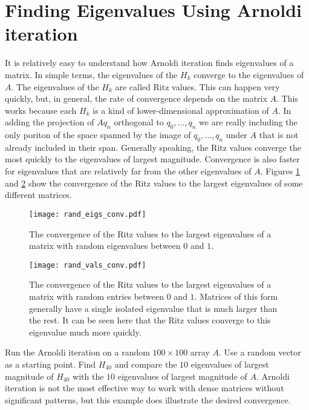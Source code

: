 
\section*{Finding Eigenvalues Using Arnoldi iteration}

It is relatively easy to understand how Arnoldi iteration finds eigenvalues of a matrix.
In simple terms, the eigenvalues of the $H_k$ converge to the eigenvalues of $A$.
The eigenvalues of the $H_k$ are called Ritz values.
This can happen very quickly, but, in general, the rate of convergence depends on the matrix $A$.
This works because each $H_k$ is a kind of lower-dimensional approximation of $A$.
In adding the projection of $A q_n$ orthogonal to $q_0, \dots, q_n$ we are really including the only poriton of the space spanned by the image of $q_0, \dots, q_n$ under $A$ that is not already included in their span.
Generally speaking, the Ritz values converge the most quickly to the eigenvalues of largest magnitude.
Convergence is also faster for eigenvalues that are relatively far from the other eigenvalues of $A$.
Figures \ref{fig:arnoldi_random_eig_conv} and \ref{fig:arnoldi_random_val_conv} show the convergence of the Ritz values to the largest eigenvalues of some different matrices.

\begin{figure}
\texttt{[image: rand\_eigs\_conv.pdf]}
\caption{The convergence of the Ritz values to the largest eigenvalues of a matrix with random eigenvalues between $0$ and $1$.}
\label{fig:arnoldi_random_eig_conv}
\end{figure}

\begin{figure}
\texttt{[image: rand\_vals\_conv.pdf]}
\caption{The convergence of the Ritz values to the largest eigenvalues of a matrix with random entries between $0$ and $1$.
Matrices of this form generally have a single isolated eigenvalue that is much larger than the rest.
It can be seen here that the Ritz values converge to this eigenvalue much more quickly.}
\label{fig:arnoldi_random_val_conv}
\end{figure}

\begin{problem}
Run the Arnoldi iteration on a random $100 \times 100$ array $A$.
Use a random vector as a starting point.
Find $H_{40}$ and compare the $10$ eigenvalues of largest magnitude of $H_{40}$ with the $10$ eigenvalues of largest magnitude of $A$.
Arnoldi iteration is not the most effective way to work with dense matrices without significant patterns, but this example does illustrate the desired convergence.
\end{problem}


